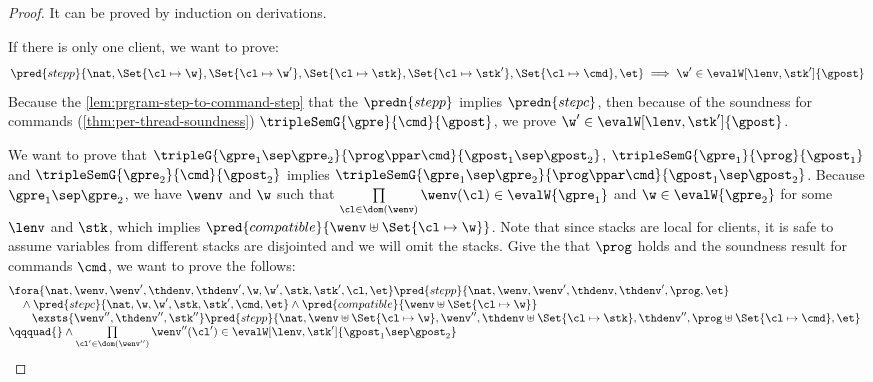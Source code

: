 \begin{proof}
It can be proved by induction on derivations.

\caseB{\( \prog = \Set{\txid \mapsto \cmd} \)}
 
If there is only one client, we want to prove:
\[
    \pred{stepp}{\nat, \Set{\cl \mapsto \w},\Set{\cl \mapsto \w'}, \Set{\cl \mapsto \stk}, \Set{ \cl \mapsto \stk'}, \Set{\cl \mapsto \cmd}, \et} \implies \w' \in \evalW[\lenv, \stk']{\gpost}
\]
Because the \cref{lem:prgram-step-to-command-step} that the \( \predn{stepp} \) implies \( \predn{stepc}\), then because of the soundness for commands (\cref{thm:per-thread-soundness}) \( \tripleSemG{\gpre}{\cmd}{\gpost}\), we prove \( \w' \in \evalW[\lenv, \stk']{\gpost} \).

\caseI{\( \prog \ppar \cmd \)}

We want to prove that \( \tripleG{\gpre_{1} \sep \gpre_{2}}{\prog \ppar \cmd}{ \gpost_{1} \sep \gpost_{2} } \), \( \tripleSemG{\gpre_{1}}{\prog}{ \gpost_{1} } \) and \( \tripleSemG{\gpre_{2}}{\cmd}{ \gpost_{2} } \) implies \( \tripleSemG{\gpre_{1} \sep \gpre_{2}}{\prog \ppar \cmd}{ \gpost_{1} \sep \gpost_{2} } \).
Because \( \gpre_{1} \sep \gpre_{2} \), we have \( \wenv \) and \( \w \) such that \( \prod\limits_{\cl \in \dom(\wenv)} \wenv(\cl) \in \evalW{\gpre_{1}} \) and \( \w \in \evalW{\gpre_{2}}\) for some \( \lenv \) and \( \stk \), which implies \( \pred{compatible}{\wenv \uplus \Set{\cl \mapsto \w}}\).
Note that since stacks are local for clients, it is safe to assume variables from different stacks are disjointed and we will omit the stacks.
Give the \ih that \( \prog \) holds and the soundness result for commands \( \cmd \), we want to prove the follows:
\[
\begin{array}{@{}l}
    \fora{\nat, \wenv, \wenv', \thdenv, \thdenv', \w, \w', \stk, \stk', \cl, \et} 
    \pred{stepp}{\nat, \wenv, \wenv', \thdenv, \thdenv', \prog, \et}  \\
    \quad {} \land \pred{stepc}{\nat, \w, \w', \stk, \stk', \cmd, \et} 
    \land \pred{compatible}{\wenv \uplus \Set{\cl \mapsto \w}} \\
    \qquad \exsts{\wenv'', \thdenv'', \stk'' } 
    \pred{stepp}{\nat, \wenv \uplus \Set{\cl \mapsto \w}, \wenv'', \thdenv \uplus \Set{\cl \mapsto \stk}, \thdenv'', \prog \uplus \Set{\cl \mapsto \cmd}, \et}  \\
    \qqquad {} \land \prod\limits_{\cl' \in \dom(\wenv'') } \wenv''(\cl')  \in \evalW[\lenv, \stk']{\gpost_{1} \sep \gpost_{2}}
\end{array}
\]
\end{proof}
